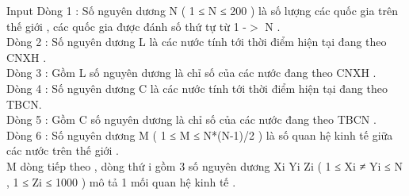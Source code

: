 Input
Dòng 1 : Số nguyên dương N ( 1 ≤ N ≤ 200 ) là số lượng các quốc gia trên thế giới , các quốc gia được đánh số thứ tự từ 1 -$>$ N .   
\\   Dòng 2 : Số nguyên dương L là các nước tính tới thời điểm hiện tại đang theo CNXH .   
\\   Dòng 3 : Gồm L số nguyên dương là chỉ số của các nước đang theo CNXH .   
\\   Dòng 4 : Số nguyên dương C là các nước tính tới thời điểm hiện tại đang theo TBCN.   
\\   Dòng 5 : Gồm C số nguyên dương là chỉ số của các nước đang theo TBCN .   
\\   Dòng 6 : Số nguyên dương M ( 1 ≤ M ≤ N*(N-1)/2 ) là số quan hệ kinh tế giữa các nước trên thế giới .   
\\   M dòng tiếp theo , dòng thứ i gồm 3 số nguyên dương Xi Yi Zi ( 1 ≤ Xi ≠ Yi ≤ N , 1 ≤ Zi ≤ 1000 ) mô tả 1 mối quan hệ kinh tế .